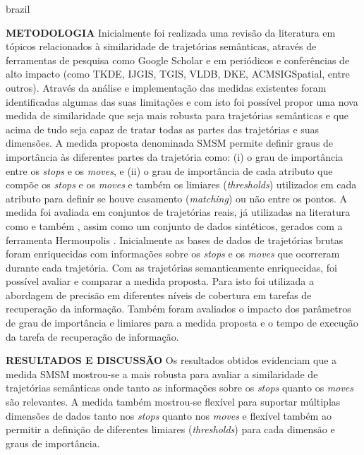 {\begin{otherlanguage*}{brazil}
\begin{resumo}
        \textbf{METODOLOGIA}
        \newline
        \newline
        Inicialmente foi realizada uma revisão da literatura em tópicos relacionados à similaridade de trajetórias semânticas, através de ferramentas de pesquisa como Google Scholar e em periódicos e conferências de alto impacto (como TKDE, IJGIS, TGIS, VLDB, DKE, ACMSIGSpatial, entre outros). Através da análise e implementação das medidas existentes foram identificadas algumas das suas limitações e com isto foi possível propor uma nova medida de similaridade que seja mais robusta para trajetórias semânticas  e que acima de tudo seja capaz de tratar todas as partes das trajetórias e suas dimensões.
        \newline
        A medida proposta denominada SMSM permite definir graus de importância às diferentes partes da trajetória como: (i) o grau de importância entre os \emph{stops} e os \emph{moves}, e (ii) o grau de importância de cada atributo que compõe os \emph{stops} e os \emph{moves} e também os limiares (\emph{thresholds}) utilizados em cada atributo para definir se houve casamento (\emph{matching}) ou não entre os pontos.
        \newline
        A medida foi avaliada em conjuntos de trajetórias reais, já utilizadas na literatura como \cite{epfl-mobility-20090224} e também \cite{zheng2009mining}, assim como um conjunto de dados sintéticos, gerados com a ferramenta Hermoupolis \cite{Pelekis-Hermoupolis}. 
        Inicialmente as bases de dados de trajetórias brutas foram enriquecidas com informações sobre os \emph{stops} e os \emph{moves} que ocorreram durante cada trajetória. %
        Com as trajetórias semanticamente enriquecidas, foi possível avaliar e comparar a medida proposta. Para isto foi utilizada a abordagem de precisão em diferentes níveis de cobertura \cite{BaezaYatesRibeiroNeto2011} em tarefas de recuperação da informação. Também foram avaliados o impacto dos parâmetros de grau de importância e limiares para a medida proposta e o tempo de execução da tarefa de recuperação de informação.
        \newline
        \newline
        
        \textbf{RESULTADOS E DISCUSSÃO}
        \newline
        \newline
        Os resultados obtidos evidenciam que a medida SMSM mostrou-se a mais robusta para avaliar a similaridade de trajetórias semânticas onde tanto as informações sobre os \emph{stops} quanto os \emph{moves} são relevantes. A medida também mostrou-se flexível para suportar múltiplas dimensões de dados tanto nos \emph{stops} quanto nos \emph{moves} e flexível também ao permitir a definição de diferentes limiares (\emph{thresholds}) para cada dimensão e graus de importância.
        

\end{resumo}
\end{otherlanguage*}}

